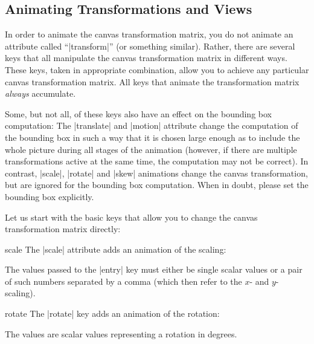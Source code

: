 \subsection{Animating Transformations  and Views}
\label{section-base-animation-views}

In order to animate the canvas transformation matrix, you do not animate an
attribute called ``|transform|'' (or something similar). Rather, there are
several keys that all manipulate the canvas transformation matrix in different
ways. These keys, taken in appropriate combination, allow you to achieve any
particular canvas transformation matrix. All keys that animate the
transformation matrix \emph{always} accumulate.

Some, but not all, of these keys also have an effect on the bounding box
computation: The |translate| and |motion| attribute change the computation of
the bounding box in such a way that it is chosen large enough as to include the
whole picture during all stages of the animation (however, if there are
multiple transformations active at the same time, the computation may not be
correct). In contrast, |scale|, |rotate| and |skew| animations change the
canvas transformation, but are ignored for the bounding box computation. When
in doubt, please set the bounding box explicitly.

Let us start with the basic keys that allow you to change the canvas
transformation matrix directly:

\begin{animateattribute}{scale}
    The |scale| attribute adds an animation of the scaling:
\begin{codeexample}[animation list={0.5,1,1.5,2}]
\end{codeexample}
    The values passed to the |entry| key must either be single scalar values or
    a pair of such numbers separated by a comma (which then refer to the $x$-
    and $y$-scaling).
\end{animateattribute}

\begin{animateattribute}{rotate}
    The |rotate| key adds an animation of the rotation:
\begin{codeexample}[animation list={0.5,1,1.5,2}]
\end{codeexample}
    The values are scalar values representing a rotation in degrees.
\end{animateattribute}

